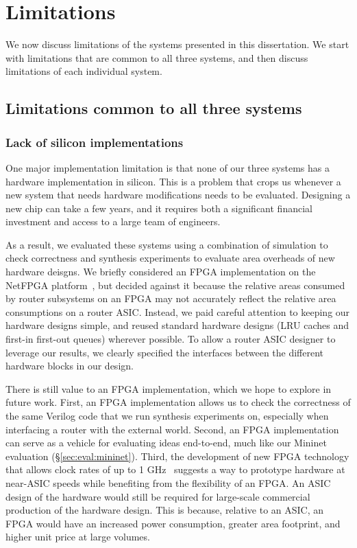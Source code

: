 \chapter{Limitations}
\label{chap:limitations}

We now discuss limitations of the systems presented in this dissertation. We
start with limitations that are common to all three systems, and then discuss
limitations of each individual system.

\section{Limitations common to all three systems}

\subsection{Lack of silicon implementations} One major implementation limitation is
that none of our three systems has a hardware implementation in silicon. This
is a problem that crops us whenever a new system that needs hardware
modifications needs to be evaluated. Designing a new chip can take a few years,
and it requires both a significant financial investment and access to a large
team of engineers.

 As a result, we evaluated these systems using a combination of simulation to
check correctness and synthesis experiments to evaluate area overheads of new
hardware deisgns. We briefly considered an FPGA implementation on the NetFPGA
platform~\cite{netfpga}, but decided against it because the relative areas
consumed by router subsystems on an FPGA may not accurately reflect the
relative area consumptions on a router ASIC. Instead, we paid careful attention
to keeping our hardware designs simple, and reused standard hardware designs
(\eg LRU caches and first-in first-out queues) wherever possible. To allow a
router ASIC designer to leverage our results, we clearly specified the
interfaces between the different hardware blocks in our design.

There is still value to an FPGA implementation, which we hope to explore in
future work. First, an FPGA implementation allows us to check the correctness
of the same Verilog code that we run synthesis experiments on, especially when
interfacing a router with the external world. Second, an FPGA implementation
can serve as a vehicle for evaluating ideas end-to-end, much like our Mininet
evaluation (\S\ref{sec:eval:mininet}). Third, the development of new FPGA
technology that allows clock rates of up to 1 GHz~\cite{hyperflex} suggests a
way to prototype hardware at near-ASIC speeds while benefiting from the
flexibility of an FPGA. An ASIC design of the hardware would still be required
for large-scale commercial production of the hardware design.  This is because,
relative to an ASIC, an FPGA would have an increased power consumption, greater
area footprint, and higher unit price at large volumes.


